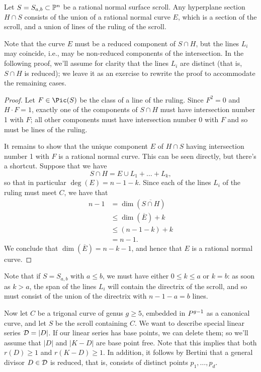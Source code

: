\begin{lemma}\label{reducible sections}
Let $S = S_{a,b} \subset \PP^n$ be a rational normal surface scroll. Any hyperplane section $H \cap S$ consists of the union of a rational normal curve $E$, which is a section of the scroll, and a union of lines of the ruling of the scroll.
\end{lemma}

Note that the curve $E$ must be a reduced component of $S \cap H$, but the lines $L_i$ may coincide, i.e., may be non-reduced components of the intersection. In the following proof, we'll assume for clarity that the lines $L_i$ are distinct (that is, $S \cap H$ is reduced); we leave it as an exercise to rewrite the proof to accommodate the remaining cases.

\begin{proof}
Let $F \in \Pic(S)$ be the class of a line of the ruling. Since $F^2 = 0$ and $H\cdot F = 1$, exactly one of the components of $S \cap H$ must have intersection number 1 with $F$; all other components must have intersection number 0 with $F$ and so must be lines of the ruling.

It remains to show that the unique component $E$ of $H \cap S$ having intersection number 1 with $F$ is a rational normal curve. This can be seen directly, but there's a shortcut. Suppose that we have
$$
S \cap H = E \cup L_1 + \dots + L_k,
$$
so that in particular $\deg(E) = n-1-k$. Since each of the lines $L_i$ of the ruling must meet $C$, we have that
\begin{align*}
n-1 &= \dim(\overline{S \cap H}) \\
&\leq \dim(\overline {E}) + k\\
&\leq (n-1-k) + k \\
&= n-1.
\end{align*}
We conclude that $\dim(\overline E) = n-k-1$, and hence that $E$ is a rational normal curve.
\end{proof}

Note that if $S = S_{a,b}$ with $a \leq b$, we must have either $0 \leq k \leq a$ or $k = b$: as soon as $k > a$, the span of the lines $L_i$ will contain the directrix of the scroll, and so must consist of the union of the directrix with $n-1-a = b$ lines.

Now let $C$ be a trigonal curve of genus $g \geq 5$, embedded in $\\P^{g-1}$ as a canonical curve, and let $S$ be the scroll containing $C$. We want to describe special linear series $\cD = |D|$. If our linear series has base points, we can delete them; so we'll assume that $|D|$ and $|K-D|$ are base point free. Note that this implies that   both  $r(D) \geq 1$ and $r(K-D) \geq 1$. In addition, it follows by Bertini that a general divisor $D \in \cD$ is reduced, that is, consists of distinct points $p_1,\dots,p_d$.

